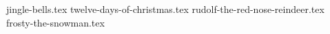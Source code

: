 \documentclass[letterpaper]{article}
\begin{document}
\begin{songs}{}


{jingle-bells.tex}
{twelve-days-of-christmas.tex}
{rudolf-the-red-nose-reindeer.tex}
{frosty-the-snowman.tex}

\begin{comment}
\end{comment}

\end{songs}
\end{document}
